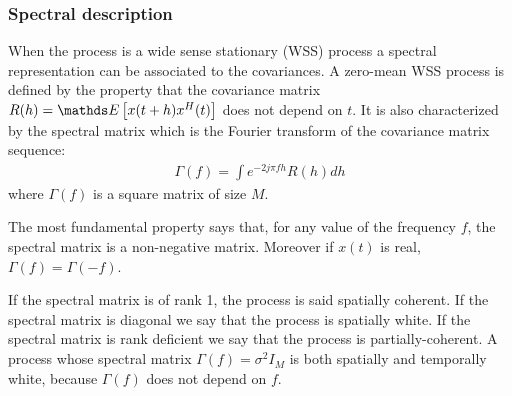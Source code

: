 \subsubsection{Spectral description}
When the process is a wide sense stationary (WSS) process  a spectral representation can be associated to the covariances. A zero-mean WSS  process is defined by the property that the covariance matrix $R(h)=\esp{x(t+h)x^{H}(t)}$ does not depend on $t$. It is also characterized by the spectral matrix which is the Fourier transform of the covariance matrix sequence:
\begin{eqnarray}
 \Gamma(f) = \int e^{-2j\pi fh}R(h)dh
\end{eqnarray}
where $\Gamma(f)$ is a square matrix of size $M$.

The most fundamental property says that, for any value of the frequency $f$, the spectral matrix is a non-negative matrix. Moreover if $x(t)$ is real, $\Gamma(f)=\Gamma(-f)$.

If the spectral matrix is of rank 1, the process is said spatially coherent. If the spectral matrix is diagonal we say that the process is spatially white. If the spectral matrix is rank deficient we say that the process is partially-coherent. A process whose spectral matrix $\Gamma(f)=\sigma^{2}I_{M}$ is both spatially and temporally  white, because $\Gamma(f)$ does not depend on $f$.

